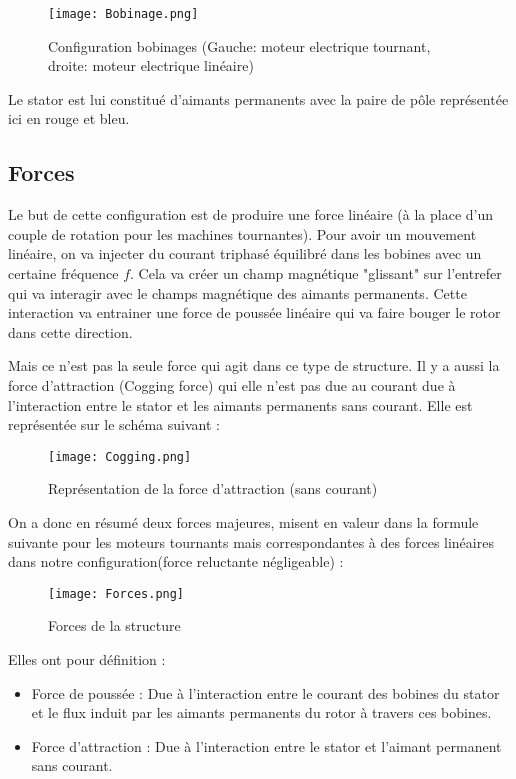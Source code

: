 \begin{figure}[H]
    \centering
    \texttt{[image: Bobinage.png]}
    \caption{Configuration bobinages (Gauche: moteur electrique tournant, droite: moteur electrique linéaire)}

\end{figure}

Le stator est lui constitué d'aimants permanents avec la paire de pôle représentée ici en rouge et bleu.

\subsection*{Forces}
Le but de cette configuration est de produire une force linéaire (à la place d'un couple de rotation pour les machines tournantes). 
Pour avoir un mouvement linéaire, on va injecter du courant triphasé équilibré dans les bobines avec un certaine fréquence $f$. Cela va créer un champ magnétique "glissant" sur l'entrefer qui va interagir avec le champs magnétique des aimants permanents. Cette interaction va entrainer une force de poussée linéaire qui va faire bouger le rotor dans cette direction.

Mais ce n'est pas la seule force qui agit dans ce type de structure. Il y a aussi la force d'attraction (Cogging force) qui elle n'est pas due au courant due à l'interaction entre le stator et les aimants permanents sans courant. Elle est représentée sur le schéma suivant :

\begin{figure}[H]
    \centering
    \texttt{[image: Cogging.png]}
    \caption{Représentation de la force d'attraction (sans courant)}

\end{figure}

On a donc en résumé deux forces majeures, misent en valeur dans la formule suivante pour les moteurs tournants mais correspondantes à des forces linéaires dans notre configuration(force reluctante négligeable) : 
\begin{figure}[H]
    \centering
    \texttt{[image: Forces.png]}
    \caption{Forces de la structure}
\end{figure}
Elles ont pour définition : 
\begin{itemize}
    \item Force de poussée : Due à l'interaction entre le courant des bobines du stator et le flux induit par les aimants permanents du rotor à travers ces bobines.
    \item Force d'attraction : Due à l'interaction entre le stator et l'aimant permanent sans courant.
\end{itemize}
